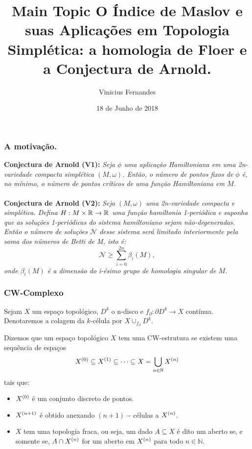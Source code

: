 \documentclass{beamer}
\title[Short title]{Main Topic } %
\author{Vinicius Fernandes}
\title{O Índice de Maslov e suas Aplicações em Topologia Simplética: a homologia de Floer e a Conjectura de Arnold.}
\institute{Universidade Federal do ABC}
\date{18 de Junho de 2018}
\begin{document}
	
	\begin{frame}
		\titlepage %
	\end{frame}
	
\begin{footnotesize}
	
	\begin{frame}
		\frametitle{
			A motivação.}
		\textbf{Conjectura de Arnold (V1):} \textit{Seja $\phi$ uma aplicação Hamiltoniana em uma 2n-variedade compacta simplética $(M, \omega)$. Então, o número de pontos fixos de $\phi$ é, no mínimo, o número de pontos críticos de uma função Hamiltoniana em $M$.}
		\\~\\
		
		\textbf{Conjectura de Arnold (V2):} \textit	{Seja $(M,\omega)$ uma 2n-variedade compacta e simplética. Defina  $H:M\times \mathbb{R}^{} \to \mathbb{R}^{}$  uma função hamiltonia 1-periódica e suponha que as soluções 1-periódicas do sistema hamiltoniano sejam não-degeneradas. Então o número de soluções $\mathcal{N}$ desse sistema será limitado interiormente pela soma dos números de Betti de M, isto é:
			$$
			\mathcal{N}\geq \sum_{i=0}^{2n}\beta_{i}(M),
			$$
			onde $\beta_{i}(M)$ é a dimensão do i-ésimo grupo de homologia singular de $M$.}
	\end{frame}
	
	\begin{frame}
	
		\frametitle{CW-Complexo}
		\begin{definicao}
			Sejam $X$ um espaço topológico, $D^{k}$ o n-disco e $f_{\partial}:\partial D^{k} \to X$ contínua. Denotaremos a colagem da $k$-célula por $X\cup_{f_{\partial}}D^{k}$.
		\end{definicao}
		
		\begin{definicao}[CW-complexo]
			Dizemos que um espaço topológico $X$ tem uma CW-estrutura se existem uma sequência de espaços
			$$
			X^{(0)} \subseteq X^{(1)} \subseteq \dots \subseteq X = \bigcup \limits_{n\in \mathbb{N}} X^{(n)}
			$$ 
			tais que:
			\begin{itemize}
				\item $X^{(0)}$ é um conjunto discreto de pontos.
				
				\item $X^{(n+1)}$ é obtido anexando $(n+1)-$células a $X^{(n)}$.
				
				\item $X$ tem uma topologia fraca, ou seja, um dado $A \subseteq X$ é dito um aberto se, e somente se, $A \cap X^{(n)}$ for um aberto em $X^{(n)}$ para todo $n \in \mathbb{N}$.
			\end{itemize}
		\end{definicao}
	\end{frame}
	

\end{footnotesize}
\end{document}
